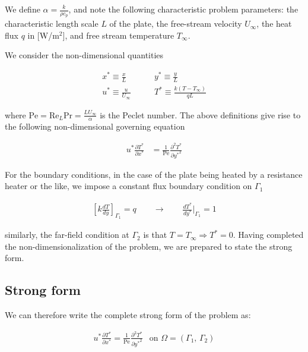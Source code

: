 \documentclass[10pt]{article}
\newcommand{\ReL}{\text{Re}_L}
\newcommand{\Pra}{\text{Pr}}
\newcommand{\Pe}{\text{Pe}}
\begin{document}
    We define $\alpha = \frac{k}{\rho c_p}$, and note the following characteristic problem
    parameters: the characteristic length scale $L$ of the plate, the free-stream velocity
    $U_\infty$,  the heat flux $q$ in [W/m$^2$], and free stream temperature $T_\infty$.
    
    We consider the non-dimensional quantities

      \begin{align}
        x^* \equiv \frac{x}{L} &\qquad y^* \equiv \frac{y}{L} \\
        u^* \equiv \frac{u}{U_\infty} &\qquad T^* \equiv \frac{k(T - T_\infty)}{qL} 
      \end{align}

    where $\Pe = \ReL \Pra = \frac{L U_\infty}{\alpha}$ is the Peclet number. The above
    definitions give rise to the following non-dimensional governing equation

    \begin{align}
      u^*\frac{\partial T^*}{\partial x^*} 
      &=\frac{1}{\Pe}\frac{\partial^2 T^*}{\partial {y^*}^2} 
    \end{align}

    For the boundary conditions, in the case of the plate being heated by a resistance heater or the
    like, we impose a constant flux boundary condition on $\Gamma_1$

    \begin{align}
      \left[k\frac{dT}{dy}\right]_{\Gamma_1} = q
      \qquad \rightarrow \qquad 
      \frac{dT^*}{dy^*}\bigg|_{\Gamma_1} = 1
      \label{eq:fluxBC}
    \end{align}
     
    similarly, the far-field condition at $\Gamma_2$ is that $T = T_\infty \Rightarrow T^* = 0$.
    Having completed the non-dimensionalization of the problem, we are prepared to state the strong
    form.

    \subsection{Strong form}
    We can therefore write the complete strong form
    of the problem as:

    \begin{align}
      u^*\frac{\partial T^*}{\partial x^*} 
      =\frac{1}{\Pe}\frac{\partial^2 T^*}{\partial {y^*}^2} 
      \;\,\text{ on } \Omega=(\Gamma_1,\, \Gamma_2)
    \end{align}
\end{document}
